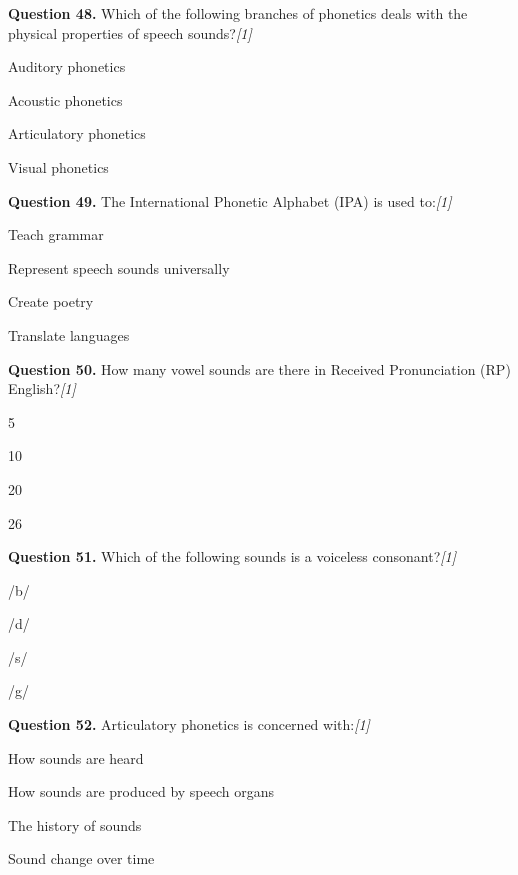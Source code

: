 \documentclass[11pt,a4paper]{article}
\newcommand{\pts}[1]{\hfill   \textit{[#1]}}
\begin{document}
\medskip


\noindent   \textbf{Question 48.} Which of the following branches of phonetics deals with the physical properties of speech sounds?\pts{1}

\begin{parts}
  \item Auditory phonetics
  \item Acoustic phonetics
  \item Articulatory phonetics
  \item Visual phonetics
\end{parts}

\medskip


\noindent   \textbf{Question 49.} The International Phonetic Alphabet (IPA) is used to:\pts{1}

\begin{parts}
  \item Teach grammar
  \item Represent speech sounds universally
  \item Create poetry
  \item Translate languages
\end{parts}

\medskip


\noindent   \textbf{Question 50.} How many vowel sounds are there in Received Pronunciation (RP) English?\pts{1}

\begin{parts}
  \item 5
  \item 10
  \item 20
  \item 26
\end{parts}

\medskip


\noindent   \textbf{Question 51.} Which of the following sounds is a voiceless consonant?\pts{1}

\begin{parts}
  \item /b/
  \item /d/
  \item /s/
  \item /g/
\end{parts}

\medskip


\noindent   \textbf{Question 52.} Articulatory phonetics is concerned with:\pts{1}

\begin{parts}
  \item How sounds are heard
  \item How sounds are produced by speech organs
  \item The history of sounds
  \item Sound change over time
\end{parts}
\end{document}
